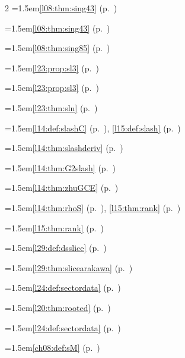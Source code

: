 \begin{multicols}{2}
\hangindent=1.5em\quad \ref{l08:thm:sing43} (p.~\pageref{l08:thm:sing43})\par
\hangindent=1.5em\quad \ref{l08:thm:sing43} (p.~\pageref{l08:thm:sing43})\par
\hangindent=1.5em\quad \ref{l08:thm:sing85} (p.~\pageref{l08:thm:sing85})\par
\hangindent=1.5em\quad \ref{l23:prop:sl3} (p.~\pageref{l23:prop:sl3})\par
\hangindent=1.5em\quad \ref{l23:prop:sl3} (p.~\pageref{l23:prop:sl3})\par
\hangindent=1.5em\quad \ref{l23:thm:sln} (p.~\pageref{l23:thm:sln})\par
\hangindent=1.5em\quad \ref{l14:def:slashC} (p.~\pageref{l14:def:slashC}), \ref{l15:def:slash} (p.~\pageref{l15:def:slash})\par
\hangindent=1.5em\quad \ref{l14:thm:slashderiv} (p.~\pageref{l14:thm:slashderiv})\par
\hangindent=1.5em\quad \ref{l14:thm:G2slash} (p.~\pageref{l14:thm:G2slash})\par
\hangindent=1.5em\quad \ref{l14:thm:zhuGCE} (p.~\pageref{l14:thm:zhuGCE})\par
\hangindent=1.5em\quad \ref{l14:thm:rhoS} (p.~\pageref{l14:thm:rhoS}), \ref{l15:thm:rank} (p.~\pageref{l15:thm:rank})\par
\hangindent=1.5em\quad \ref{l15:thm:rank} (p.~\pageref{l15:thm:rank})\par
\hangindent=1.5em\quad \ref{l29:def:dsslice} (p.~\pageref{l29:def:dsslice})\par
\hangindent=1.5em\quad \ref{l29:thm:slicearakawa} (p.~\pageref{l29:thm:slicearakawa})\par
\hangindent=1.5em\quad \ref{l24:def:sectordata} (p.~\pageref{l24:def:sectordata})\par
\hangindent=1.5em\quad \ref{l20:thm:rooted} (p.~\pageref{l20:thm:rooted})\par
\hangindent=1.5em\quad \ref{l24:def:sectordata} (p.~\pageref{l24:def:sectordata})\par
\hangindent=1.5em\quad \ref{ch08:def:sM} (p.~\pageref{ch08:def:sM})\par

\end{multicols}
